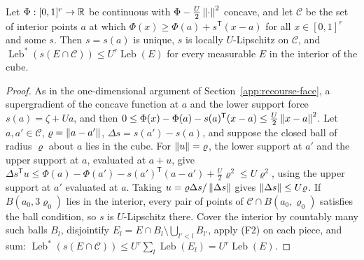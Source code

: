 \begin{lemma}
\label{lem:recourse-contact}
Let $\Phi:[0,1]^r\to\mathbb R$ be continuous with $\Phi-\frac U2\left\lVert\cdot\right\rVert^2$
concave, and let $\mathcal C$ be the set of interior points $a$ at which
$\Phi(x)\ge\Phi(a)+s^{\mathsf T}(x-a)$ for all $x\in[0,1]^r$ and some $s$.
Then $s=s(a)$ is unique, $s$ is locally $U$-Lipschitz on $\mathcal C$,
and $\operatorname{Leb}^*(s(E\cap\mathcal C))\le U^r\operatorname{Leb}(E)$ for
every measurable $E$ in the interior of the cube.
\end{lemma}

\begin{proof}
As in the one-dimensional argument of Section~\ref{app:recourse-face},
a supergradient of the concave function at $a$ and the lower support
force $s(a)=\zeta+Ua$, and then
$0\le\Phi(x)-\Phi(a)-s(a)^{\mathsf T}(x-a)\le\frac U2\left\lVert x-a\right\rVert^2$. Let
$a,a'\in\mathcal C$, $\varrho=\left\lVert a-a'\right\rVert$, $\Delta s=s(a')-s(a)$, and
suppose the closed ball of radius $\varrho$ about $a$ lies in the cube.
For $\left\lVert u\right\rVert=\varrho$, the lower support at $a'$ and the upper support at
$a$, evaluated at $a+u$, give
$\Delta s^{\mathsf T}u\le\Phi(a)-\Phi(a')-s(a')^{\mathsf T}(a-a')+\frac U2\varrho^2
\le U\varrho^2$, using the upper support at $a'$ evaluated at $a$.
Taking $u=\varrho\Delta s/\left\lVert\Delta s\right\rVert$ gives
$\left\lVert\Delta s\right\rVert\le U\varrho$. If $B(a_0,3\varrho_0)$ lies in the
interior, every pair of points of $\mathcal C\cap B(a_0,\varrho_0)$
satisfies the ball condition, so $s$ is $U$-Lipschitz there. Cover the
interior by countably many such balls $B_l$, disjointify
$E_l=E\cap B_l\setminus\bigcup_{l'<l}B_{l'}$, apply (F2) on each piece,
and sum: $\operatorname{Leb}^*(s(E\cap\mathcal C))\le
U^r\sum_l\operatorname{Leb}(E_l)=U^r\operatorname{Leb}(E)$.
\end{proof}

